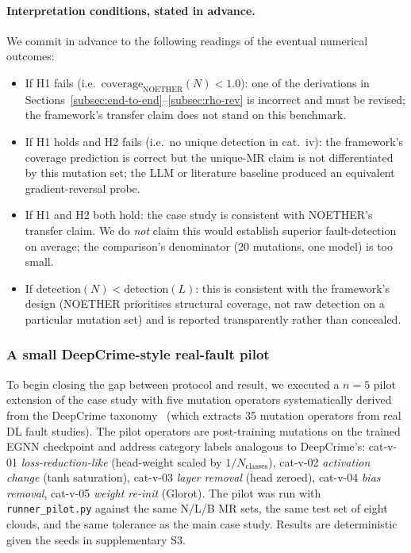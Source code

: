 \documentclass[manuscript]{acmart}
\begin{document}
\paragraph{Interpretation conditions, stated in advance.}
We commit in advance to the following readings of the eventual numerical outcomes:
\begin{itemize}
    \item If H1 fails (i.e.\ $\mathrm{coverage}_{\mathrm{NOETHER}}(N) < 1.0$): one of the derivations in Sections~\ref{subsec:end-to-end}--\ref{subsec:rho-rev} is incorrect and must be revised; the framework's transfer claim does not stand on this benchmark.
    \item If H1 holds and H2 fails (i.e.\ no unique detection in cat.~iv): the framework's coverage prediction is correct but the unique-MR claim is not differentiated by this mutation set; the LLM or literature baseline produced an equivalent gradient-reversal probe.
    \item If H1 and H2 both hold: the case study is consistent with NOETHER's transfer claim. We do \emph{not} claim this would establish superior fault-detection on average; the comparison's denominator (20 mutations, one model) is too small.
    \item If $\mathrm{detection}(N) < \mathrm{detection}(L)$: this is consistent with the framework's design (NOETHER prioritises structural coverage, not raw detection on a particular mutation set) and is reported transparently rather than concealed.
\end{itemize}

\subsubsection{A small DeepCrime-style real-fault pilot}
\label{subsec:deepcrime-pilot}

To begin closing the gap between protocol and result, we executed a $n=5$ pilot extension of the case study with five mutation operators systematically derived from the DeepCrime taxonomy~\cite{Humbatova2021DeepCrime} (which extracts 35 mutation operators from real DL fault studies). The pilot operators are post-training mutations on the trained EGNN checkpoint and address category labels analogous to DeepCrime's: cat-v-01 \emph{loss-reduction-like} (head-weight scaled by $1/N_{\text{classes}}$), cat-v-02 \emph{activation change} (tanh saturation), cat-v-03 \emph{layer removal} (head zeroed), cat-v-04 \emph{bias removal}, cat-v-05 \emph{weight re-init} (Glorot). The pilot was run with \texttt{runner\_pilot.py} against the same N/L/B MR sets, the same test set of eight clouds, and the same tolerance as the main case study. Results are deterministic given the seeds in supplementary S3.
\end{document}
